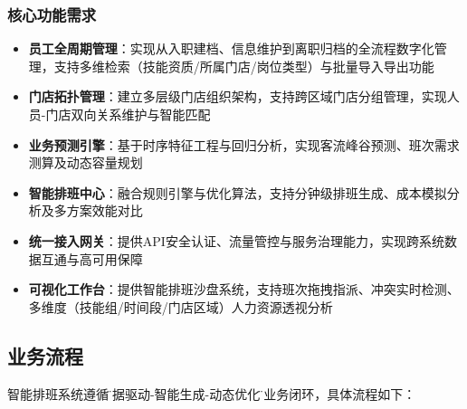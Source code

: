 \documentclass{ctexart}
\begin{document}
\subsubsection{核心功能需求}
\begin{itemize}
    \item \textbf{员工全周期管理}：实现从入职建档、信息维护到离职归档的全流程数字化管理，支持多维检索（技能资质/所属门店/岗位类型）与批量导入导出功能
    
    \item \textbf{门店拓扑管理}：建立多层级门店组织架构，支持跨区域门店分组管理，实现人员-门店双向关系维护与智能匹配
    
    \item \textbf{业务预测引擎}：基于时序特征工程与回归分析，实现客流峰谷预测、班次需求测算及动态容量规划
    
    \item \textbf{智能排班中心}：融合规则引擎与优化算法，支持分钟级排班生成、成本模拟分析及多方案效能对比
    
    \item \textbf{统一接入网关}：提供API安全认证、流量管控与服务治理能力，实现跨系统数据互通与高可用保障
    
    \item \textbf{可视化工作台}：提供智能排班沙盘系统，支持班次拖拽指派、冲突实时检测、多维度（技能组/时间段/门店区域）人力资源透视分析
\end{itemize}

\subsection{业务流程}
智能排班系统遵循\"数据驱动-智能生成-动态优化\"的业务闭环，具体流程如下：
\end{document}
